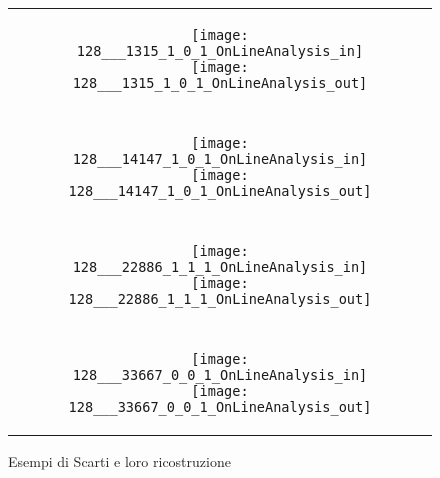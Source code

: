 \begin{figure}[ht] %
  \begin{center}
    \begin{tabular}{c}

      \begin{subfigure}{\linewidth}
        \begin{center}
          \texttt{[image: 128\_\_\_1315\_1\_0\_1\_OnLineAnalysis\_in]}
          \texttt{[image: 128\_\_\_1315\_1\_0\_1\_OnLineAnalysis\_out]}
        \end{center}
      \end{subfigure} \\ \\

      \begin{subfigure}{\linewidth}
        \begin{center}
          \texttt{[image: 128\_\_\_14147\_1\_0\_1\_OnLineAnalysis\_in]}
          \texttt{[image: 128\_\_\_14147\_1\_0\_1\_OnLineAnalysis\_out]}
        \end{center}
      \end{subfigure} \\ \\

      \begin{subfigure}{\linewidth}
        \begin{center}
          \texttt{[image: 128\_\_\_22886\_1\_1\_1\_OnLineAnalysis\_in]}
          \texttt{[image: 128\_\_\_22886\_1\_1\_1\_OnLineAnalysis\_out]}
        \end{center}
      \end{subfigure} \\ \\

      \begin{subfigure}{\linewidth}
        \begin{center}
          \texttt{[image: 128\_\_\_33667\_0\_0\_1\_OnLineAnalysis\_in]}
          \texttt{[image: 128\_\_\_33667\_0\_0\_1\_OnLineAnalysis\_out]}
        \end{center}
      \end{subfigure}

    \end{tabular}
    \caption{Esempi di Scarti e loro ricostruzione}
    \label{fig:scarti_in_out}
  \end{center}
\end{figure}

